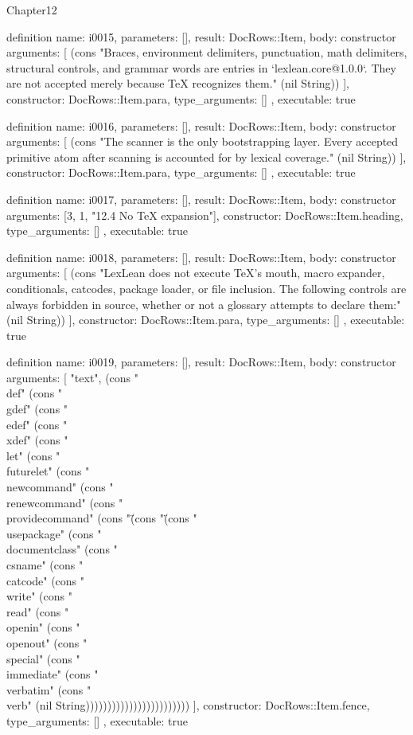 \begin{lexlean}{Chapter12}
\begin{semanticmodule}
definition{
  name: i0015,
  parameters: [],
  result: DocRows::Item,
  body: constructor{
    arguments: [
      (cons "Braces, environment delimiters, punctuation, math delimiters, structural controls, and grammar words are entries in `lexlean.core@1.0.0`. They are not accepted merely because TeX recognizes them." (nil String))
    ],
    constructor: DocRows::Item.para,
    type_arguments: []
  },
  executable: true
}

definition{
  name: i0016,
  parameters: [],
  result: DocRows::Item,
  body: constructor{
    arguments: [
      (cons "The scanner is the only bootstrapping layer. Every accepted primitive atom after scanning is accounted for by lexical coverage." (nil String))
    ],
    constructor: DocRows::Item.para,
    type_arguments: []
  },
  executable: true
}

definition{
  name: i0017,
  parameters: [],
  result: DocRows::Item,
  body: constructor{
    arguments: [3, 1, "12.4 No TeX expansion"],
    constructor: DocRows::Item.heading,
    type_arguments: []
  },
  executable: true
}

definition{
  name: i0018,
  parameters: [],
  result: DocRows::Item,
  body: constructor{
    arguments: [
      (cons "LexLean does not execute TeX's mouth, macro expander, conditionals, catcodes, package loader, or file inclusion. The following controls are always forbidden in source, whether or not a glossary attempts to declare them:" (nil String))
    ],
    constructor: DocRows::Item.para,
    type_arguments: []
  },
  executable: true
}

definition{
  name: i0019,
  parameters: [],
  result: DocRows::Item,
  body: constructor{
    arguments: [
      "text",
      (cons "\\def" (cons "\\gdef" (cons "\\edef" (cons "\\xdef" (cons "\\let" (cons "\\futurelet" (cons "\\newcommand" (cons "\\renewcommand" (cons "\\providecommand" (cons "\" (cons "\" (cons "\\usepackage" (cons "\\documentclass" (cons "\\csname" (cons "\\catcode" (cons "\\write" (cons "\\read" (cons "\\openin" (cons "\\openout" (cons "\\special" (cons "\\immediate" (cons "\\verbatim" (cons "\\verb" (nil String))))))))))))))))))))))))
    ],
    constructor: DocRows::Item.fence,
    type_arguments: []
  },
  executable: true
}


\end{semanticmodule}
\end{lexlean}
